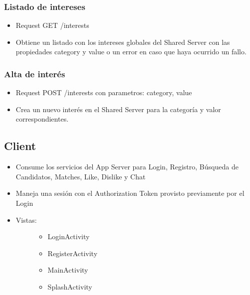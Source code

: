 \documentclass[letterpaper,10pt,english]{sphinxmanual}
\begin{document}
\subsubsection{Listado de intereses}
\label{manuals:listado-de-intereses}\begin{itemize}
\item {} 
Request GET /interests

\item {} 
Obtiene un listado con los intereses globales del Shared Server con las propiedades category y value o un error en caso que haya ocurrido un fallo.

\end{itemize}


\subsubsection{Alta de interés}
\label{manuals:alta-de-interes}\begin{itemize}
\item {} 
Request POST /interests con parametros: category, value

\item {} 
Crea un nuevo interés en el Shared Server para la categoría y valor correspondientes.

\end{itemize}


\subsection{Client}
\label{manuals:client}\begin{itemize}
\item {} 
Consume los servicios del App Server para Login, Registro, Búsqueda de Candidatos, Matches, Like, Dislike y Chat

\item {} 
Maneja una sesión con el Authorization Token provisto previamente por el Login

\item {} \begin{description}
\item[{Vistas:}] \leavevmode\begin{itemize}
\item {} 
LoginActivity

\item {} 
RegisterActivity

\item {} 
MainActivity

\item {} 
SplashActivity

\end{itemize}

\end{description}

\end{itemize}
\end{document}
